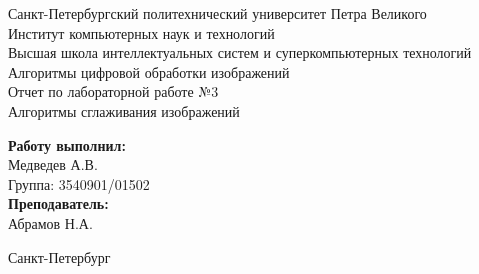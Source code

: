 \begin{titlepage}	%

	\begin{center}		%

		\large Санкт-Петербургский политехнический университет Петра Великого\\
		\large Институт компьютерных наук и технологий \\
		\large Высшая школа интеллектуальных систем и суперкомпьютерных технологий\\[6cm]

		\huge Алгоритмы цифровой обработки изображений\\[0.5cm] %
		\large Отчет по лабораторной работе №3 \\[0.1cm]
		\large Алгоритмы сглаживания изображений \\[5cm]

	\end{center}


	\begin{flushright} %
		\begin{minipage}{0.25\textwidth} %
			\begin{flushleft} %

				\large\textbf{Работу выполнил:}\\
				\large Медведев А.В.\\
				\large {Группа:} 3540901/01502\\

				\large \textbf{Преподаватель:}\\
				\large Абрамов Н.А.

			\end{flushleft}
		\end{minipage}
	\end{flushright}

	\vfill %

	\begin{center}
	\large Санкт-Петербург\\
	\large \the\year %
	\end{center} %

\end{titlepage} %

\vfill %